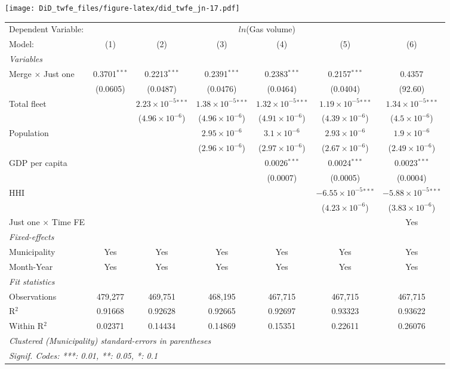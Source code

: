 \documentclass[
]{article}
\begin{document}
\texttt{[image: DiD\_twfe\_files/figure-latex/did\_twfe\_jn-17.pdf]}

\begin{tabular}{lcccccc}
\tabularnewline\midrule\midrule
Dependent Variable:&\multicolumn{6}{c}{$ln$(Gas volume)}\\
Model:&(1) & (2) & (3) & (4) & (5) & (6)\\
\midrule \emph{Variables}&   &   &   &   &   &  \\
Merge $\times $ Just one & 0.3701$^{***}$ & 0.2213$^{***}$ & 0.2391$^{***}$ & 0.2383$^{***}$ & 0.2157$^{***}$ & 0.4357\\
  &(0.0605) & (0.0487) & (0.0476) & (0.0464) & (0.0404) & (92.60)\\
Total fleet &    & $2.23\times 10^{-5}$$^{***}$ & $1.38\times 10^{-5}$$^{***}$ & $1.32\times 10^{-5}$$^{***}$ & $1.19\times 10^{-5}$$^{***}$ & $1.34\times 10^{-5}$$^{***}$\\
  &   & ($4.96\times 10^{-6}$) & ($4.96\times 10^{-6}$) & ($4.91\times 10^{-6}$) & ($4.39\times 10^{-6}$) & ($4.5\times 10^{-6}$)\\
Population &    &    & $2.95\times 10^{-6}$ & $3.1\times 10^{-6}$ & $2.93\times 10^{-6}$ & $1.9\times 10^{-6}$\\
  &   &    & ($2.96\times 10^{-6}$) & ($2.97\times 10^{-6}$) & ($2.67\times 10^{-6}$) & ($2.49\times 10^{-6}$)\\
GDP per capita &    &    &    & 0.0026$^{***}$ & 0.0024$^{***}$ & 0.0023$^{***}$\\
  &   &    &    & (0.0007) & (0.0005) & (0.0004)\\
HHI &    &    &    &    & $-6.55\times 10^{-5}$$^{***}$ & $-5.88\times 10^{-5}$$^{***}$\\
  &   &    &    &    & ($4.23\times 10^{-6}$) & ($3.83\times 10^{-6}$)\\
Just one $\times$ Time FE &  &  &  &  &  & Yes\\
\midrule \emph{Fixed-effects}&   &   &   &   &   &  \\
Municipality & Yes & Yes & Yes & Yes & Yes & Yes\\
Month-Year & Yes & Yes & Yes & Yes & Yes & Yes\\
\midrule \emph{Fit statistics}&  & & & & & \\
Observations & 479,277&469,751&468,195&467,715&467,715&467,715\\
R$^2$ & 0.91668&0.92628&0.92665&0.92697&0.93323&0.93622\\
Within R$^2$ & 0.02371&0.14434&0.14869&0.15351&0.22611&0.26076\\
\midrule\midrule\multicolumn{7}{l}{\emph{Clustered (Municipality) standard-errors in parentheses}}\\
\multicolumn{7}{l}{\emph{Signif. Codes: ***: 0.01, **: 0.05, *: 0.1}}\\
\end{tabular}
\end{document}
